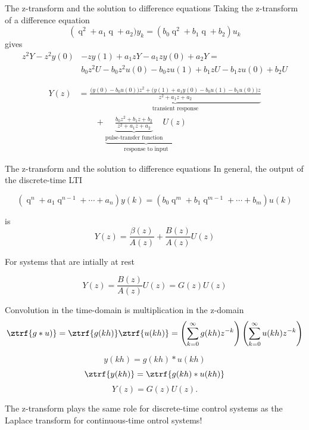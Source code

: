 \documentclass[presentation,aspectratio=169]{beamer}
\DeclareMathOperator{\shift}{q}
\begin{document}
\begin{frame}[label={sec:org982df2f}]{The z-transform and the solution to difference equations}
Taking the z-transform of a difference equation 
\[ \left( \shift^2 + a_1\shift + a_2) y_k = \left(b_0\shift^2 + b_1\shift + b_2 \right) u_k\]
gives
\begin{equation*}
\begin{split}
z^{2}Y -z^2y(0) &- zy(1) + a_1zY - a_1zy(0) + a_2Y =\\
&     b_0z^2U -b_0z^2u(0) - b_0zu(1) + b_1zU - b_1zu(0) + b_2U
\end{split}
\end{equation*}

\begin{equation*}
\begin{split}
 Y(z) &= \underbrace{ \frac{ \big( y(0)-b_0u(0)\big) z^2 + \big(y(1)+a_1y(0) - b_0u(1) -b_1u(0)\big) z}{z^2 + a_1z + a_2}}_{\text{transient response}}\\
 & \qquad + \underbrace{\underbrace{\frac{b_0z^2 + b_1z + b_2}{z^2 + a_1z + a_2}}_{\text{pulse-transfer function}}U(z)}_{\text{response to input}}
\end{split}
\end{equation*}
\end{frame}

\begin{frame}[label={sec:org308f283}]{The z-transform and the solution to difference equations}
In general, the output of the discrete-time LTI 

\[ \left( \shift^n + a_1 \shift^{n-1} + \cdots + a_n \right) y(k) = \left( b_0 \shift^m + b_1\shift^{m-1} + \cdots + b_m \right)  u(k) \]

is
\[ Y(z) = \frac{\beta(z)}{A(z)} + \frac{B(z)}{A(z)} U(z) \]

For systems that are intially at rest

\[ Y(z) = \frac{B(z)}{A(z)} U(z)  = G(z) U(z) \]
\end{frame}

\begin{frame}[label={sec:org829f215}]{Convolution in the time-domain is multiplication in the z-domain}
\[ \ztrf{g \ast u)} = \ztrf{g(kh)} \ztrf{u(kh)} = \left(\sum_{k=0}^{\infty} g(kh)z^{-k}\right) \left(\sum_{k=0}^{\infty} u(kh)z^{-k}\right)\]


\begin{LaTeX}
\begin{center}
\end{center}
\end{LaTeX}
\[ y(kh) = g(kh) \ast u(kh) \]
\[ \ztrf{y(kh)} = \ztrf{g(kh) \ast u(kh)} \]
\[ Y(z) = G(z) U(z). \]

The z-transform plays the same role for discrete-time control  systems as the Laplace transform for continuous-time ontrol systems!
\end{frame}
\end{document}
